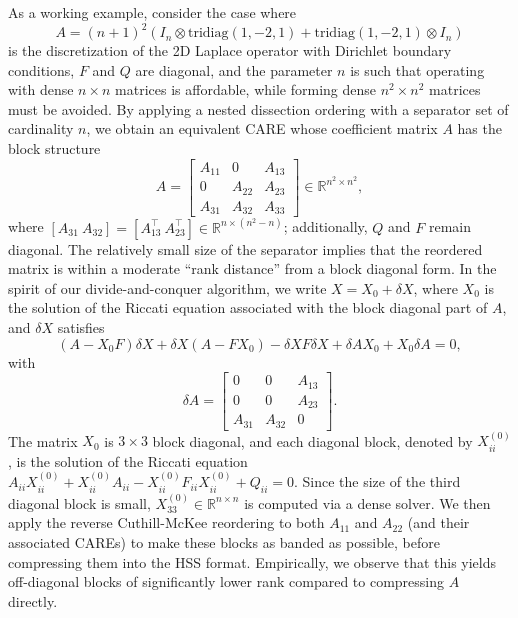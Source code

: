 \documentclass[a4paper,10pt]{article}
\begin{document}
{As a working example, consider the case where 
\begin{equation}\label{eq:2d-laplace}
	A=(n+1)^2\left(I_n\otimes \mathrm{tridiag}(1,-2,1) + \mathrm{tridiag}(1,-2,1)\otimes I_n\right) 
\end{equation}
is the discretization of the 2D Laplace operator with Dirichlet boundary conditions, $F$ and $Q$ are diagonal, and the parameter $n$ is such that operating with dense $n\times n$ matrices is affordable, while forming dense $n^2\times n^2$ matrices must be avoided. By applying a nested dissection ordering with a separator set of cardinality $n$, we obtain an equivalent CARE whose coefficient matrix $A$ has the block structure
$$
A=\begin{bmatrix}
	A_{11}&0&A_{13}\\
	0&A_{22}&A_{23}\\
	A_{31}&A_{32}&A_{33}
\end{bmatrix}\in\mathbb R^{n^2\times n^2},
$$
where $[A_{31}\ A_{32} ] = [A_{13}^\top\ A_{23}^\top ]\in\mathbb R^{n\times(n^2-n)}$; additionally, $Q$ and $F$ remain diagonal. The relatively small size of the separator implies that the reordered matrix is within a moderate ``rank distance'' from a block diagonal form. In the spirit of our divide-and-conquer algorithm, we write $X=X_0+\delta X$, where $X_0$ is the solution of the Riccati equation associated with the block diagonal part of $A$, and $\delta X$ satisfies
$$
(A-X_0F)\delta X+\delta X(A-FX_0)-\delta XF\delta X+\delta AX_0+X_0\delta A=0,
$$
with
$$
\delta A = \begin{bmatrix}
	0&0&A_{13}\\
	0&0&A_{23}\\
	A_{31}&A_{32}&0
\end{bmatrix}.
$$
The matrix $X_0$ is $3\times 3$ block diagonal, and each diagonal block, denoted by $X_{ii}^{(0)}$, is the solution of the Riccati equation $A_{ii}X_{ii}^{(0)}+ X_{ii}^{(0)}A_{ii}-X_{ii}^{(0)}F_{ii}X_{ii}^{(0)}+Q_{ii}=0$. Since the size of the third diagonal block is small, $X_{33}^{(0)}\in\mathbb R^{n\times n}$ is computed via a dense solver. We then apply the reverse Cuthill-McKee reordering to both $A_{11}$ and $A_{22}$ (and their associated CAREs) to make these blocks as banded as possible, before compressing them into the HSS format. Empirically, we observe that this yields off-diagonal blocks of significantly lower rank compared to compressing $A$ directly. 

}
\end{document}
